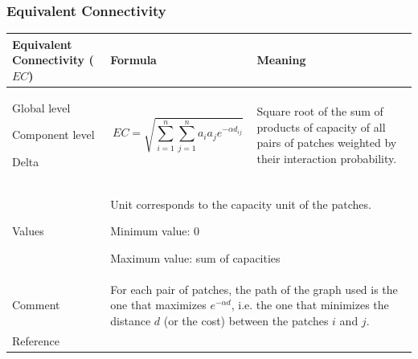 \documentclass{article}
\begin{document}
\subsubsection{Equivalent Connectivity}
\label{metric_EC}
\begin{table}[H]
\begin{tabular}{|m{3.24cm}|m{4.4810004cm}m{7.924cm}|}
\hline
Equivalent Connectivity ($EC$) &
\multicolumn{1}{m{4.4810004cm}|}{Formula} &
Meaning\\\hline
Global level 

Component level

Delta &
\multicolumn{1}{m{4.4810004cm}|}{\begin{equation*}
\mathit{EC}=\sqrt{\sum _{i=1}^{n}{\sum _{j=1}^{n}{{a}_{i}}}{{a}_{j}e}^{-\alpha {d}_{\mathit{ij}}}}
\end{equation*}
} &
Square root of the sum of products of capacity of all pairs of patches weighted by their interaction probability. \\\hline
Values &
\multicolumn{2}{m{12.6050005cm}|}{Unit corresponds to the capacity unit of the patches.
	
Minimum value: 0

Maximum value: sum of capacities
}\\\hline
Comment &
\multicolumn{2}{m{12.6050005cm}|}{For each pair of patches, the path of
the graph used is the one that maximizes ${e}^{-\mathit{\alpha d}}$,
i.e. the one that minimizes the distance $d$ (or the cost) between the
patches $i$ and $j$.

}\\\hline
Reference &
\multicolumn{2}{m{12.6050005cm}|}{
\cite{Saura2011}
}\\\hline
\end{tabular}
\end{table}
\end{document}

